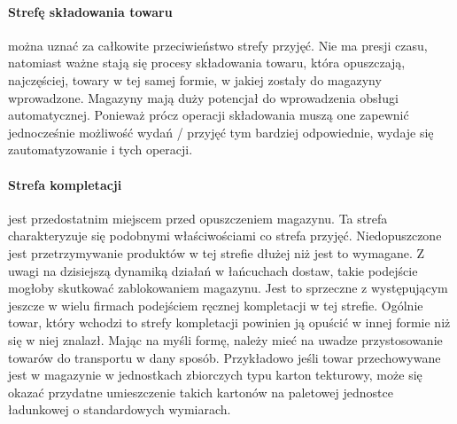 		\paragraph{Strefę składowania towaru} można uznać za całkowite przeciwieństwo strefy przyjęć. Nie ma presji czasu, 
		natomiast ważne stają się procesy składowania towaru, która opuszczają, najczęściej, towary w tej samej formie,
		w jakiej zostały do magazyny wprowadzone. Magazyny mają duży potencjał do wprowadzenia obsługi automatycznej. 
		Ponieważ prócz operacji składowania muszą one zapewnić jednocześnie możliwość wydań / przyjęć tym bardziej odpowiednie,
		wydaje się zautomatyzowanie i tych operacji. 
		\paragraph{Strefa kompletacji} jest przedostatnim miejscem przed opuszczeniem magazynu. Ta strefa charakteryzuje się
		podobnymi właściwościami co strefa przyjęć. Niedopuszczone jest przetrzymywanie produktów w tej strefie dłużej niż jest 
		to wymagane. Z uwagi na dzisiejszą dynamiką działań w łańcuchach dostaw, takie podejście mogłoby skutkować zablokowaniem
		magazynu. Jest to sprzeczne z występującym jeszcze w wielu firmach podejściem ręcznej kompletacji w tej strefie. Ogólnie
		towar, który wchodzi to strefy kompletacji powinien ją opuścić w innej formie niż się w niej znalazł. Mając na myśli formę,
		należy mieć na uwadze przystosowanie towarów do transportu w dany sposób. Przykładowo jeśli towar przechowywane jest w magazynie
		w jednostkach zbiorczych typu karton tekturowy, może się okazać przydatne umieszczenie takich kartonów na paletowej 
		jednostce ładunkowej o standardowych wymiarach. 

